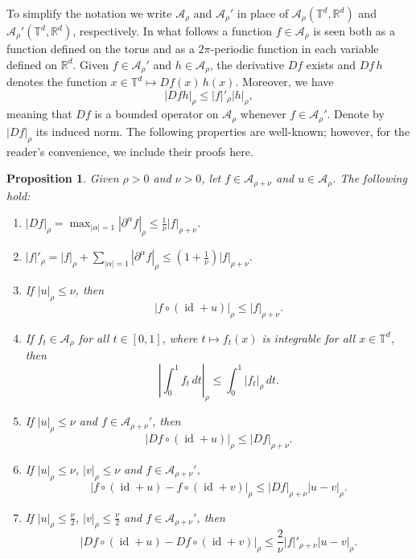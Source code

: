 \documentclass[12pt,reqno,a4paper]{amsart}%
\numberwithin{equation}{section}
\newtheorem{proposition}[theorem]{Proposition}
\newcommand{\A}{{\mathcal A}}
\newcommand{\Rr}{{\mathbb{R}}}
\newcommand{\Tt}{{\mathbb{T}}}
\newcommand{\id}  {\operatorname{id}}
\begin{document}
%
%


To simplify the notation we write $\A_{\rho}$ and $\A_{\rho}'$ in place of $\A_{\rho}(\Tt^d,\Rr^d)$ and $\A_{\rho}'(\Tt^d,\Rr^d)$, respectively.	
In what follows a function $f\in\mathcal A_{\rho}$ is seen both as a function defined on the torus and as a $2\pi$-periodic function in each variable defined on $\Rr^d$. 	
Given $f\in \A_{\rho}'$ and $h\in \A_{\rho}$, the derivative $Df$ exists and  $Df\,h$ denotes the function $x\in\Tt^d\mapsto Df(x)\,h(x)$. Moreover, we have
$$
|Dfh|_{\rho}\leq |f|'_{\rho}|h|_{\rho},
$$ 
meaning that $Df$ is a bounded operator on $\A_{\rho}$ whenever $f\in\A_{\rho}'$. Denote by $|Df|_{\rho}$ its induced norm. The following properties are well-known; however, for the reader's convenience, we include their proofs here.



\begin{proposition}\label{prop:norms}
Given $\rho>0$ and $\nu>0$, let $f\in \A_{\rho+\nu}$ and $u\in \A_{\rho}$. The following hold:
\begin{enumerate}
\item \label{prop A1 a}
$|Df|_\rho=\max_{|\alpha|=1}|\partial^\alpha f|_\rho\leq \frac1\nu|f|_{\rho+\nu}$.
\item $|f|'_{\rho}=|f|_\rho+\sum_{|\alpha|=1}|\partial^\alpha f|_\rho\leq \left(1+\frac{1}{\nu}\right)|f|_{\rho+\nu}$.
\item If $|u|_\rho\leq \nu$, then 
$$
|f\circ(\id+u)|_\rho\leq |f|_{\rho+\nu}.
$$
\item
If $f_t\in\A_\rho$ for all $t\in[0,1]$, where $t\mapsto f_t(x)$ is integrable for all $x\in\Tt^d$, then
$$
\left| \int_0^1 f_t\,dt \right|_\rho \leq 
\int_0^1 \left| f_t \right|_\rho \,dt.
$$
\item If $|u|_\rho\leq \nu$ and $f\in  \A_{\rho+\nu}'$, then 
$$
|Df\circ(\id+u)|_\rho\leq |Df|_{\rho+\nu}.
$$
\item If $|u|_\rho\leq \nu$, $|v|_\rho\leq \nu$ and $f\in  \A_{\rho+\nu}'$,
$$
|f\circ(\id+u)-f\circ(\id+v)|_\rho\leq |Df|_{\rho+\nu}|u-v|_\rho.
$$
\item If $|u|_\rho\leq \frac\nu2$, $|v|_\rho\leq \frac\nu2$ and $f\in  \A_{\rho+\nu}'$, then 
$$
|Df\circ(\id+u)-Df\circ(\id+v)|_\rho\leq\frac{2}{\nu} |f|'_{\rho+\nu}|u-v|_\rho.
$$
\end{enumerate}
\end{proposition}
\end{document}
